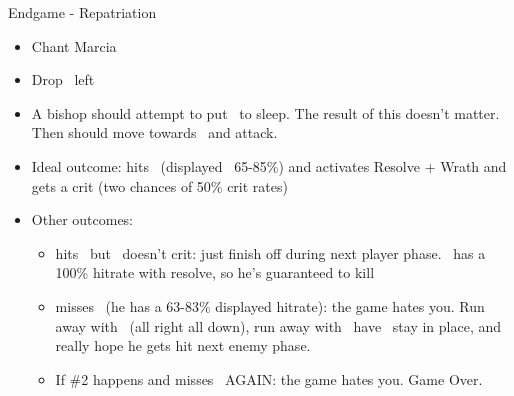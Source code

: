 \begin{battlespecial}{Endgame - Repatriation}
\begin{multicols}{2}
\begin{enumerate}
{    
    \reysonf
    \begin{itemize}
        \item Chant Marcia
    \end{itemize}
    \marciaf
    \begin{itemize}
        \item Drop \ike\ left
    \end{itemize}
    \turnend
}
\end{enumerate}
\begin{itemize}
    \item A bishop should attempt to put \marcia\ to sleep. The result of this doesn’t matter.
    Then  should move towards \ike\ and attack.
    \vspace{2mm}
    \item Ideal outcome:  hits \ike\ (displayed ~65-85\%) and activates Resolve + Wrath and gets a crit (two chances of 50\% crit rates)

    \item Other outcomes:
    \begin{itemize}
        \item {} hits \ike\, but \ike\ doesn’t crit: just finish off  during next player phase. \ike\ has a 100\% hitrate with resolve, so he’s guaranteed to kill 
        \item {} misses \ike\ (he has a 63-83\% displayed hitrate): the game hates you. Run away with \marcia\ (all right all down), run away with \elincia\, have \ike\ stay in place, and really hope he gets hit next enemy phase.
        \item If \#2 happens and  misses \ike\ AGAIN: the game hates you. Game Over.
    \end{itemize}
\end{itemize}
\end{multicols}
\end{battlespecial}
